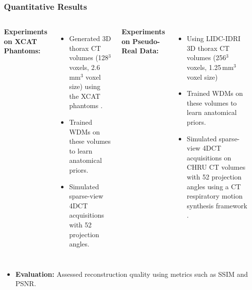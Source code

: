 \begin{frame}[t,fragile]
  \frametitle{Quantitative Results}

  \begin{columns}[T]
    \textbf{Experiments on XCAT Phantoms:}
    \begin{itemize}
      \item Generated 3D thorax CT volumes (128$^3$ voxels, 2.6\,mm$^3$ voxel size) using the XCAT phantoms \cite{segars20104d}.
      \item Trained WDMs on these volumes to learn anatomical priors.
      \item Simulated sparse-view 4DCT acquisitions with 52 projection angles.
    \end{itemize}

    \pause  %

    \textbf{Experiments on Pseudo-Real Data:}
    \begin{itemize}
      \item Using LIDC-IDRI \cite{armato2011lung} 3D thorax CT volumes (256$^3$ voxels, 1.25\,mm$^3$ voxel size)
      \item Trained WDMs on these volumes to learn anatomical priors.
      \item Simulated sparse-view 4DCT acquisitions on CHRU CT volumes with 52 projection angles using a CT respiratory motion synthesis framework \cite{cao2024ct}.
    \end{itemize}
  \end{columns}

  \pause
  \begin{itemize}
    \item \textbf{Evaluation:} Assessed reconstruction quality using metrics such as SSIM and PSNR.
  \end{itemize}
\end{frame}


